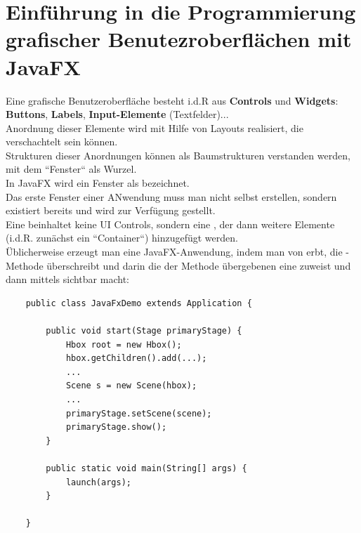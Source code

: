 \section{Einführung in die Programmierung grafischer Benutezroberflächen mit JavaFX}


Eine grafische Benutzeroberfläche besteht i.d.R aus \textbf{Controls} und \textbf{Widgets}: \textbf{Buttons}, \textbf{Labels}, \textbf{Input-Elemente} (Textfelder)...\\

\noindent
Anordnung dieser Elemente wird mit Hilfe von Layouts realisiert, die verschachtelt sein können.\\

\noindent
Strukturen dieser Anordnungen können als Baumstrukturen verstanden werden, mit dem ``Fenster`` als Wurzel.\\

\noindent
In JavaFX wird ein Fenster als  bezeichnet.\\

\noindent
Das erste Fenster einer ANwendung muss man nicht selbst erstellen, sondern existiert bereits und wird zur Verfügung gestellt.\\

\noindent
Eine  beinhaltet keine UI Controls, sondern eine , der dann weitere Elemente (i.d.R. zunächst ein ``Container``) hinzugefügt werden.\\

\noindent
Üblicherweise erzeugt man eine JavaFX-Anwendung, indem man von  erbt, die -Methode überschreibt und darin die der Methode übergebenen  eine  zuweist und dann mittels  sichtbar macht:

\begin{verbatim}
    public class JavaFxDemo extends Application {

        public void start(Stage primaryStage) {
            Hbox root = new Hbox();
            hbox.getChildren().add(...);
            ...
            Scene s = new Scene(hbox);
            ...
            primaryStage.setScene(scene);
            primaryStage.show();
        }

        public static void main(String[] args) {
            launch(args);
        }

    }
\end{verbatim}\\

